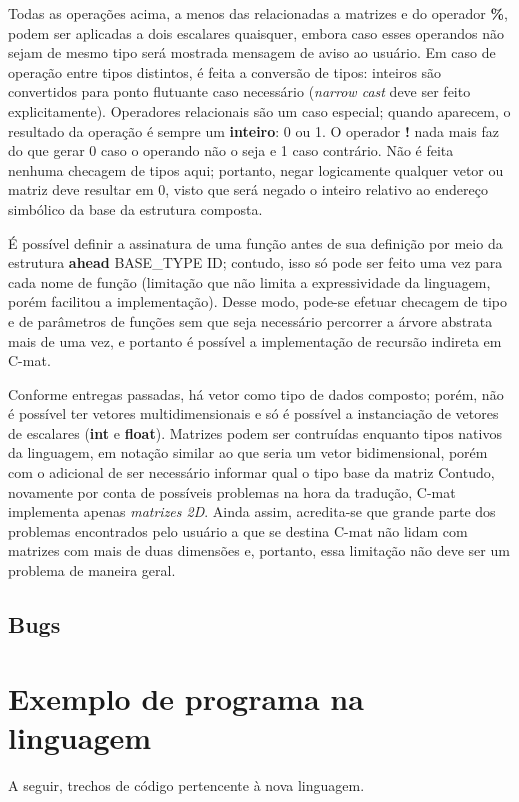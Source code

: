 \documentclass[
	article,			%
	11pt,				%
	oneside,			%
	a4paper,			%
	english,			%
	brazil,				%
	sumario=tradicional
	]{abntex2}
\renewcommand{\it}[1]{\textit{#1}}
\renewcommand{\bf}[1]{\textbf{#1}}
\begin{document}
Todas as operações acima, a menos das relacionadas a matrizes e do operador \bf{\%}, podem ser aplicadas a dois escalares quaisquer, embora caso esses operandos não sejam de mesmo tipo será mostrada mensagem de aviso ao usuário. Em caso de operação entre tipos distintos, é feita a conversão de tipos: inteiros são convertidos para ponto flutuante caso necessário (\it{narrow cast} deve ser feito explicitamente). Operadores relacionais são um caso especial; quando aparecem, o resultado da operação é sempre um \bf{inteiro}: 0 ou 1. O operador \bf{!} nada mais faz do que gerar 0 caso o operando não o seja e 1 caso contrário. Não é feita nenhuma checagem de tipos aqui; portanto, negar logicamente qualquer vetor ou matriz deve resultar em 0, visto que será negado o inteiro relativo ao endereço simbólico da base da estrutura composta.

É possível definir a assinatura de uma função antes de sua definição por meio da estrutura \bf{ahead} BASE\_TYPE ID; contudo, isso só pode ser feito uma vez para cada nome de função (limitação que não limita a expressividade da linguagem, porém facilitou a implementação). Desse modo, pode-se efetuar checagem de tipo e de parâmetros de funções sem que seja necessário percorrer a árvore abstrata mais de uma vez, e portanto é possível a implementação de recursão indireta em C-mat.

Conforme entregas passadas, há vetor como tipo de dados composto; porém, não é possível ter vetores multidimensionais e só é possível a instanciação de vetores de escalares (\bf{int} e \bf{float}). Matrizes podem ser contruídas enquanto tipos nativos da linguagem, em notação similar ao que seria um vetor bidimensional, porém com o adicional de ser necessário informar qual o tipo base da matriz Contudo, novamente por conta de possíveis problemas na hora da tradução, C-mat implementa apenas \it{matrizes 2D}. Ainda assim, acredita-se que grande parte dos problemas encontrados pelo usuário a que se destina C-mat não lidam com matrizes com mais de duas dimensões e, portanto, essa limitação não deve ser um problema de maneira geral.


\subsection{Bugs}
\label{semanticBugs}
\iffalse
\section{Exemplo de programa na linguagem}
A seguir, trechos de código pertencente à nova linguagem.
\end{document}
